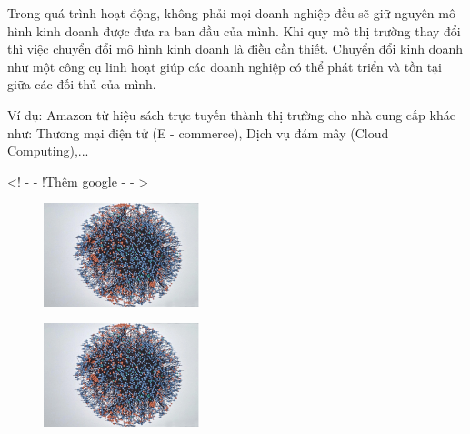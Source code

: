 


Trong quá trình hoạt động, không phải mọi doanh nghiệp đều sẽ giữ nguyên mô hình kinh doanh được đưa ra ban đầu của mình. Khi quy mô thị trường thay đổi thì việc chuyển đổi mô hình kinh doanh là điều cần thiết. Chuyển đổi kinh doanh như một công cụ linh hoạt giúp các doanh nghiệp có thể phát triển và tồn tại giữa các đối thủ của mình.

Ví dụ:
Amazon từ hiệu sách trực tuyến thành thị trường cho nhà cung cấp khác như: Thương mại điện tử (E - commerce), Dịch vụ đám mây (Cloud Computing),...

<! - - !Thêm google - - >


\begin{figure}[h]
\centering
\includegraphics[height = 3cm]{pictures/KienTrucViDichVuAmazon.png}
\end{figure}

\begin{figure}[h]
\centering
\includegraphics[height = 3cm]{pictures/KienTrucViDichVuAmazon.png}
\end{figure}

